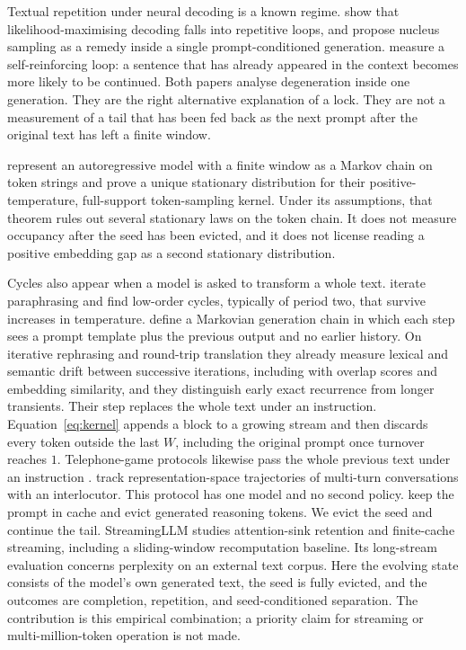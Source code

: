 \documentclass[10pt]{article}
\begin{document}
Textual repetition under neural decoding is a known regime.
\citet{holtzman2020} show that likelihood-maximising decoding falls into
repetitive loops, and propose nucleus sampling as a remedy inside a
single prompt-conditioned generation.
\citet{xu2022} measure a self-reinforcing loop: a sentence that has
already appeared in the context becomes more likely to be continued.
Both papers analyse degeneration inside one generation.
They are the right alternative explanation of a lock.
They are not a measurement of a tail that has been fed back as the next
prompt after the original text has left a finite window.

\citet{zekri2024} represent an autoregressive model with a finite window
as a Markov chain on token strings and prove a unique stationary
distribution for their positive-temperature, full-support token-sampling
kernel.
Under its assumptions, that theorem rules out several stationary laws
on the token chain.
It does not measure occupancy after the seed has been evicted, and it
does not license reading a positive embedding gap as a second stationary
distribution.

Cycles also appear when a model is asked to transform a whole text.
\citet{wang2025} iterate paraphrasing and find low-order cycles,
typically of period two, that survive increases in temperature.
\citet{geng2026} define a Markovian generation chain in which each step
sees a prompt template plus the previous output and no earlier history.
On iterative rephrasing and round-trip translation they already measure
lexical and semantic drift between successive iterations, including with
overlap scores and embedding similarity, and they distinguish early exact
recurrence from longer transients.
Their step replaces the whole text under an instruction.
Equation~\eqref{eq:kernel} appends a block to a growing stream and then
discards every token outside the last $W$, including the original prompt
once turnover reaches $1$.
Telephone-game protocols likewise pass the whole previous text under an
instruction \citep{perez2025,mohamed2025}.
\citet{ko2026} track representation-space trajectories of multi-turn
conversations with an interlocutor.
This protocol has one model and no second policy.
\citet{wang2026random} keep the prompt in cache and evict generated
reasoning tokens.
We evict the seed and continue the tail.
StreamingLLM \citep{streamingllm2024} studies attention-sink retention
and finite-cache streaming, including a sliding-window recomputation
baseline. Its long-stream evaluation concerns perplexity on an external
text corpus. Here the evolving state consists of the model's own
generated text, the seed is fully evicted, and the outcomes are
completion, repetition, and seed-conditioned separation. The contribution
is this empirical combination; a priority claim for streaming or
multi-million-token operation is not made.
\end{document}
